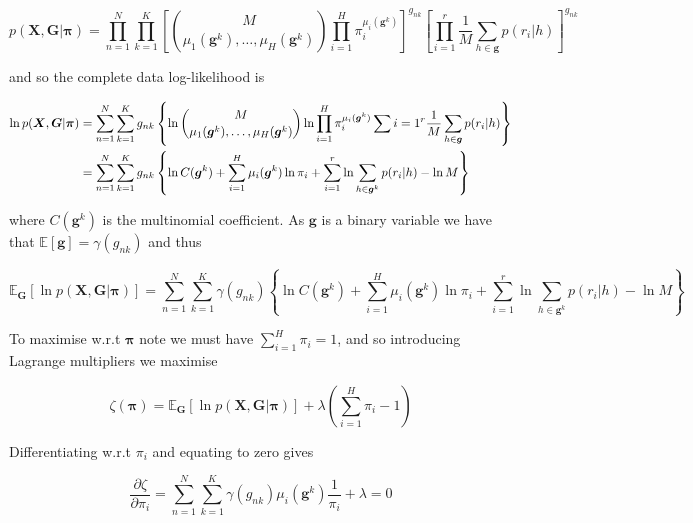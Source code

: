 \documentclass{article}
\begin{document}
\begin{equation} 
    p(\boldsymbol{X}, \boldsymbol{G} | \boldsymbol{\pi}) = \prod_{n = 1}^N \prod_{k = 1}^K \left[ \binom{M}{\mu_1(\boldsymbol{g}^k),\dots,\mu_H(\boldsymbol{g}^k)} \prod_{i = 1}^H \pi_i^{\mu_i(\boldsymbol{g}^k)} \right]^{g_{nk}} \left[ \prod_{i = 1}^{r} \frac{1}{M} \sum_{h \in \boldsymbol{g}} p(r_i | h) \right]^{g_{nk}}
\end{equation}

and so the complete data log-likelihood is

\begin{align} 
    \ln p(\boldsymbol{X}, \boldsymbol{G} | \boldsymbol{\pi}) &= \sum_{n = 1}^N \sum_{k = 1}^K g_{nk} \left\{ \ln \binom{M}{\mu_1(\boldsymbol{g}^k),\dots,\mu_H(\boldsymbol{g}^k)} \ln \prod_{i = 1}^H \pi_i^{\mu_i(\boldsymbol{g}^k)} \sum{i = 1}^{r} \frac{1}{M} \sum_{h \in \boldsymbol{g}} p(r_i | h) \right\}\notag\\
    &= \sum_{n = 1}^N \sum_{k = 1}^K g_{nk} \left\{ \ln C(\boldsymbol{g}^k) + \sum_{i = 1}^H \mu_i(\boldsymbol{g}^k) \ln \pi_i + \sum_{i = 1}^{r} \ln \sum_{h \in \boldsymbol{g}^k} p(r_i | h) - \ln M \right\}
\end{align}

where $C(\boldsymbol{g}^k)$ is the multinomial coefficient. As $\boldsymbol{g}$ is a binary variable we have that $\mathbb{E}[\boldsymbol{g}] = \gamma(g_{nk})$ and thus

\begin{equation} 
    \mathbb{E}_{\boldsymbol{G}} [\ln p(\boldsymbol{X}, \boldsymbol{G} | \boldsymbol{\pi})] = \sum_{n = 1}^N \sum_{k = 1}^K \gamma(g_{nk}) \left\{ \ln C(\boldsymbol{g}^k) + \sum_{i = 1}^H \mu_i(\boldsymbol{g}^k) \ln \pi_i + \sum_{i = 1}^{r} \ln \sum_{h \in \boldsymbol{g}^k} p(r_i | h) - \ln M \right\}
\end{equation}

To maximise w.r.t $\boldsymbol{\pi}$ note we must have $\sum_{i = 1}^H \pi_i = 1$, and so introducing Lagrange multipliers we maximise

\begin{equation} 
    \zeta(\boldsymbol{\pi}) = \mathbb{E}_{\boldsymbol{G}} [\ln p(\boldsymbol{X}, \boldsymbol{G} | \boldsymbol{\pi})] + \lambda \left( \sum_{i = 1}^H \pi_i - 1 \right)
\end{equation}

Differentiating w.r.t $\pi_i$ and equating to zero gives

\begin{equation}
\label{eq:zeta}
   \frac{\partial \zeta}{\partial \pi_i} = \sum_{n = 1}^N \sum_{k = 1}^K \gamma(g_{nk}) \mu_i(\boldsymbol{g}^k) \frac{1}{\pi_i} + \lambda = 0
\end{equation}
\end{document}
